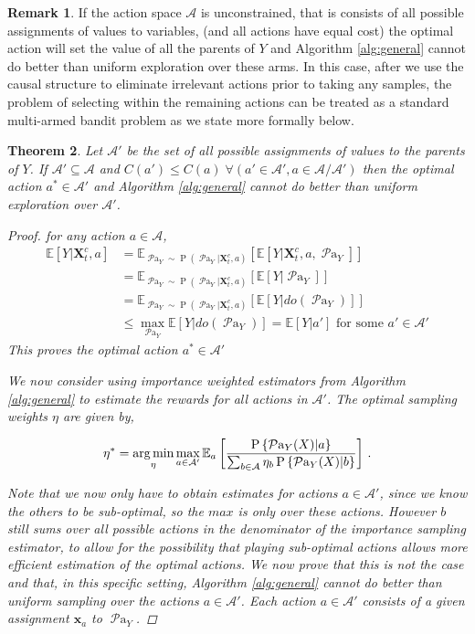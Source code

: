\documentclass[11pt,a4paper,twoside]{report}
\newcommand{\EE}{\mathbb E}
\newcommand{\EEa}{\EE_a}
\newcommand{\Pn}[2]{\operatorname{P}\left\{#2|#1\right\}}
\newcommand{\calA}{\mathcal A}
\newcommand{\Esub}[2]{\mathbb E_{#1}\left[{#2}\right]}
\newcommand{\E}[1]{\mathbb E\left[{#1}\right]}
\newcommand{\argmin}{\operatornamewithlimits{arg\,min}}
\newcommand{\eq}[1]{\begin{align*}#1\end{align*}}
\renewcommand{\P}[1]{\operatorname{P}\left(#1\right)}
\newcommand{\parents}[1]{\operatorname{\mathcal{P}a}_{#1}}
\renewcommand{\vec}[1]{\boldsymbol{#1}}
\theoremstyle{plain}
\newtheorem{theorem}{Theorem}
\theoremstyle{definition}
\newtheorem{remark}[theorem]{Remark}
\begin{document}
\begin{remark} If the action space $\mathcal{A}$ is unconstrained, that is consists of all possible assignments of values to variables, (and all actions have equal cost) the optimal action will set the value of all the parents of $Y$ and Algorithm \ref{alg:general} cannot do better than uniform exploration over these arms. In this case, after we use the causal structure to eliminate irrelevant actions prior to taking any samples, the problem of selecting within the remaining actions can be treated as a standard multi-armed bandit problem as we state more formally below. 
\end{remark} 

\vspace{0.5cm}
\begin{theorem}
\label{theorem:cb-intervene-all-parents}
Let $\mathcal{A'}$ be the set of all possible assignments of values to the parents of $Y$. If $\mathcal{A'} \subseteq \mathcal{A}$ and $C(a') \leq C(a) \; \forall (a' \in \mathcal{A'}, a \in \mathcal{A}/\mathcal{A'})$ then the optimal action $a^* \in \mathcal{A'}$ and Algorithm \ref{alg:general} cannot do better than uniform exploration over $\mathcal{A'}$.
\begin{proof}
for any action $a \in \mathcal{A}$, 
\eq{
 \E{Y|\vec{X}^c_t,a} &= \Esub{\parents{Y}\sim \P{\parents{Y}|\vec{X}^c_t,a}}{\E{Y|\vec{X}^c_t,a,\parents{Y}}} \\
 &= \Esub{\parents{Y}\sim \P{\parents{Y}|\vec{X}^c_t,a}}{\E{Y|\parents{Y}}}\\
 &= \Esub{\parents{Y}\sim \P{\parents{Y}|\vec{X}^c_t,a}}{\E{Y|do(\parents{Y})}}\\
 &\leq \max_{\parents{Y}}\E{Y|do(\parents{Y})} = \E{Y|a'} \text{ for some $a' \in \mathcal{A'}$}
}
This proves the optimal action $a^* \in \mathcal{A'}$

We now consider using importance weighted estimators from Algorithm \ref{alg:general} to estimate the rewards for all actions in $ \mathcal{A'}$. The optimal sampling weights $\eta$ are given by,

\eq{
\eta^*  = \argmin_\eta \max_{a \in \mathcal{A'}} \EEa \left[\frac{\Pn{a}{\parents{Y}(X)}}{\sum_{b \in \calA} \eta_b \Pn{b}{\parents{Y}(X)}}\right]\,.
}

Note that we now only have to obtain estimates for actions $a \in \mathcal{A'}$, since we know the others to be sub-optimal, so the $max$ is only over these actions. However $b$ still sums over all possible actions in the denominator of the importance sampling estimator, to allow for the possibility that playing sub-optimal actions allows more efficient estimation of the optimal actions. We now prove that this is not the case and that, in this specific setting, Algorithm \ref{alg:general} cannot do better than uniform sampling over the actions $a \in \mathcal{A'}$. Each action $a \in \mathcal{A'}$ consists of a given assignment $\vec{x}_a$ to $\parents{Y}$.


\end{proof}
\end{theorem}
\end{document}
